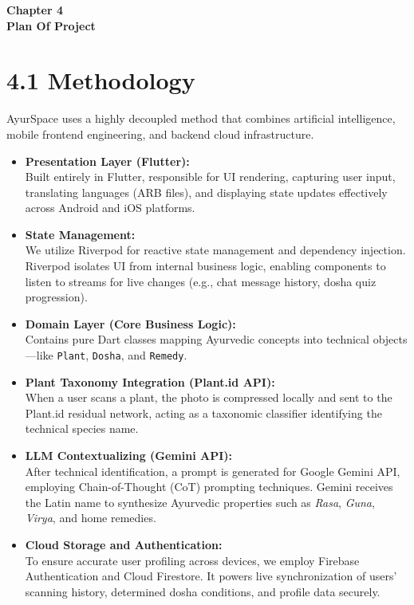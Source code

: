\documentclass[12pt]{article}
\begin{document}
\vspace*{\fill}
\begin{center}
\textbf{\Huge{Chapter 4}}\\
\vspace{5mm}
\textbf{\Huge{Plan Of Project}}
\end{center}
\vspace*{\fill}
\newpage

\section*{4.1 \quad Methodology}
\justify

AyurSpace uses a highly decoupled method that combines artificial intelligence, mobile frontend
engineering, and backend cloud infrastructure.

\begin{itemize}
    \item \textbf{Presentation Layer (Flutter):}\\
    Built entirely in Flutter, responsible for UI rendering, capturing user input, translating
    languages (ARB files), and displaying state updates effectively across Android and iOS platforms.

    \item \textbf{State Management:}\\
    We utilize Riverpod for reactive state management and dependency injection. Riverpod isolates UI
    from internal business logic, enabling components to listen to streams for live changes (e.g.,
    chat message history, dosha quiz progression).

    \item \textbf{Domain Layer (Core Business Logic):}\\
    Contains pure Dart classes mapping Ayurvedic concepts into technical objects---like
    \texttt{Plant}, \texttt{Dosha}, and \texttt{Remedy}.

    \item \textbf{Plant Taxonomy Integration (Plant.id API):}\\
    When a user scans a plant, the photo is compressed locally and sent to the Plant.id residual
    network, acting as a taxonomic classifier identifying the technical species name.

    \item \textbf{LLM Contextualizing (Gemini API):}\\
    After technical identification, a prompt is generated for Google Gemini API, employing
    Chain-of-Thought (CoT) prompting techniques. Gemini receives the Latin name to synthesize
    Ayurvedic properties such as \textit{Rasa}, \textit{Guna}, \textit{Virya}, and home remedies.

    \item \textbf{Cloud Storage and Authentication:}\\
    To ensure accurate user profiling across devices, we employ Firebase Authentication and Cloud
    Firestore. It powers live synchronization of users' scanning history, determined dosha
    conditions, and profile data securely.
\end{itemize}
\end{document}
